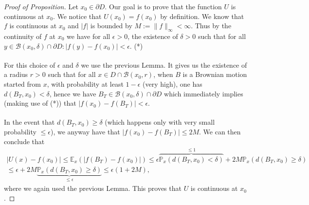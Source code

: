 \documentclass[../mainfile.tex]{subfiles}
\begin{document}
\begin{proof}[Proof of Proposition]
Let $x_0 \in \partial D$. Our goal is to prove that the function $U$ is continuous at $x_0$. We notice that $U(x_0)=f(x_0)$ by definition. We know that $f$ is continuous at $x_0$ and $|f|$ is bounded by $M:=\|f\|_\infty < \infty$. Thus by the continuity of $f$ at $x_0$ we have for all $ \epsilon >0$, the existence of $\delta >0$ such that for all $y \in \mathcal{B}(x_0, \delta) \cap \partial D : |f(y)-f(x_0)| < \epsilon$. (*)
\\\\
For this choice of $\epsilon$ and $\delta$ we use the previous Lemma. It gives us the existence of a radius $r>0$ such that for all $x \in D \cap \mathcal{B}(x_0,r)$, when $B$ is a Brownian motion started from $x$, with probability at least $1- \epsilon$ (very high), one has $d(B_T,x_0) < \delta$, hence we have $B_T \in \mathcal{B}(x_0, \delta) \cap \partial D$ which immediately implies (making use of (*)) that $|f(x_0)-f(B_T)| < \epsilon$. \\\\
In the event that $d(B_T,x_0) \geq \delta$ (which happens only with very small probability $\leq \epsilon$), we anyway have that $|f(x_0)-f(B_T)| \leq 2M$. We can then conclude that
\begin{align*}
|U(x)-f(x_0)| \leq \mathbb{E}_x(|f(B_T)-f(x_0)|) \leq \epsilon \overbrace{\mathbb{P}_x(d(B_T,x_0) < \delta)}^{\leq 1} +  2M \mathbb{P}_x(d(B_T,x_0) \geq \delta) \\ \leq \epsilon + 2 M \underbrace{\mathbb{P}_x(d(B_T,x_0) \geq \delta)}_{\leq \epsilon} \leq \epsilon (1 + 2 M),
\end{align*}
where we again used the previous Lemma. This proves that $U$ is continuous at $x_0$. 
\end{proof}
\newpage
\end{document}
